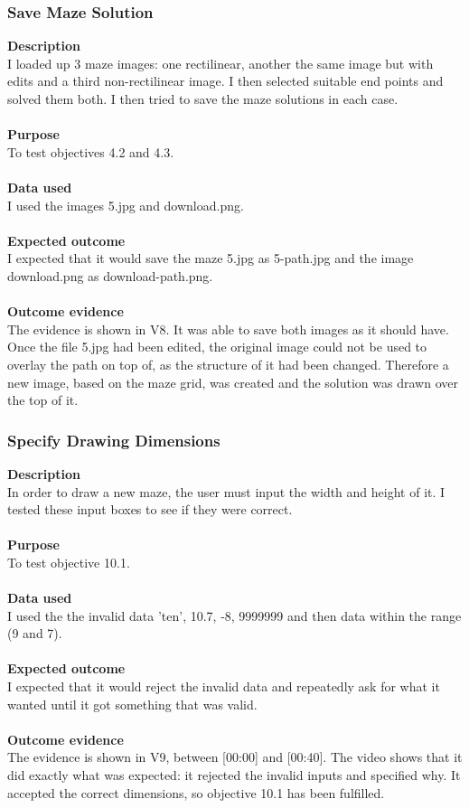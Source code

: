 \documentclass[titlepage]{article}
\begin{document}
\subsubsection{Save Maze Solution}
\textbf{Description}\\
I loaded up 3 maze images: one rectilinear, another the same image but with edits and a third non-rectilinear image. I then selected suitable end points and solved them both. I then tried to save the maze solutions in each case.\\\\
\textbf{Purpose}\\
To test objectives 4.2 and 4.3.\\\\
\textbf{Data used} \\
I used the images 5.jpg and download.png.\\\\
\textbf{Expected outcome}\\
I expected that it would save the maze 5.jpg as 5-path.jpg and the image download.png as download-path.png.\\\\
\textbf{Outcome evidence}\\
The evidence is shown in V8. It was able to save both images as it should have. Once the file 5.jpg had been edited, the original image could not be used to overlay the path on top of, as the structure of it had been changed. Therefore a new image, based on the maze grid, was created and the solution was drawn over the top of it.

\subsubsection{Specify Drawing Dimensions}
\textbf{Description}\\
In order to draw a new maze, the user must input the width and height of it. I tested these input boxes to see if they were correct.\\\\
\textbf{Purpose}\\
To test objective 10.1.\\\\
\textbf{Data used} \\
I used the the invalid data 'ten', 10.7, -8, 9999999 and then data within the range (9 and 7).\\\\
\textbf{Expected outcome}\\
I expected that it would reject the invalid data and repeatedly ask for what it wanted until it got something that was valid.\\\\
\textbf{Outcome evidence}\\
The evidence is shown in V9, between [00:00] and [00:40]. The video shows that it did exactly what was expected: it rejected the invalid inputs and specified why. It accepted the correct dimensions, so objective 10.1 has been fulfilled. 
\end{document}
